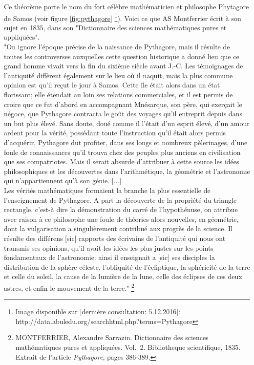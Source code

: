 \documentclass[a4paper,12pt]{article}
\begin{document}
\begin{remark}
Ce théorème porte le nom du fort célèbre mathématicien et philosophe Phytagore de Samos (voir figure  \ref{fig:pythagore} \footnote{Image disponible sur [dernière consultation: 5.12.2016]: http://data.abuledu.org/searchhtml.php?terms=Pythagore}). Voici ce que AS Montferrier écrit à son sujet en 1835, dans son "Dictionnaire des sciences mathématiques pures et appliquées".\\

"On ignore l’époque précise de la naissance de Pythagore, mais il résulte de toutes les controverses auxquelles cette question historique a donné lieu que ce grand homme vivait vers la fin du sixième siècle avant J.-C. Les témoignages de l’antiquité diffèrent également sur le lieu où il naquit, mais la plus commune opinion est qu’il reçut le jour à Samos. Cette île était alors dans un état florissant; elle étendait au loin ses relations commerciales, et il est permis de croire que ce fut d'abord en accompagnant Mnésarque, son père, qui exerçait le négoce, que Pythagore contracta le goût des voyages qu’il entreprit depuis dans un but
plus élevé. Sans doute, doué comme il l’était d’un esprit élevé, d’un amour ardent pour la vérité, possédant toute l'instruction qu’il était alors permis d’acquérir, Pythagore dut profiter, dans ses longs et nombreux pèlerinages, d’une foule de connaissances qu’il trouva chez des peuples plus anciens en civilisation que ses compatriotes. Mais il serait absurde d’attribuer à cette source les idées philosophiques et les découvertes dans l'arithmétique, la géométrie et l’astronomie qui n’appartiennent qu’à son génie.
[...]\\
Les vérités mathématiques formaient la branche la plus essentielle de l’enseignement de Pythagore. A part la découverte de la propriété du triangle rectangle, c’est-à dire la démonstration du carré de l’hypothénuse, on attribue avec raison à ce philosophe une foule de théories alors nouvelles, en géométrie, dont la vulgarisation a singulièrement contribué aux progrès de la science. Il résulte des différens [sic] rapports des écrivains de l’antiquité qui nous ont transmis ses opinions, qu’il avait les idées les plus justes sur les points fondamentaux de l’astronomie: ainsi il enseignait a [sic] ses disciples la distribution de la sphère céleste, l’obliquité de l’écliptique, la sphéricité de la terre et celle du soleil, la cause de la lumière de la lune, celle des éclipses de ces deux astres, et enfin le mouvement de la terre." \footnote{MONTFERRIER, Alexandre Sarrazin. Dictionnaire des sciences mathématiques pures et appliquées. Vol.~2. Bibliotheque scientifique, 1835. Extrait de l'article \textit{Pythagore}, pages 386-389.}


\end{remark}
\end{document}

